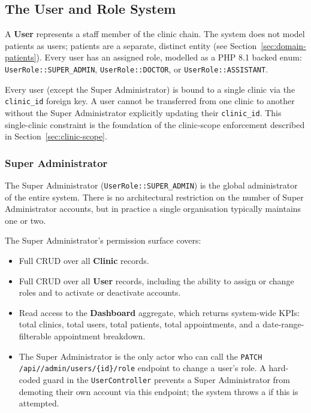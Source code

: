\subsection{The User and Role System}
\label{sec:domain-users}

A \textbf{User} represents a staff member of the clinic chain. The
system does not model patients as users; patients are a separate,
distinct entity (see Section~\ref{sec:domain-patients}). Every user has
an assigned role, modelled as a PHP 8.1 backed enum:
\texttt{UserRole::SUPER\_ADMIN}, \texttt{UserRole::DOCTOR}, or
\texttt{UserRole::ASSISTANT}.

Every user (except the Super Administrator) is bound to a single clinic
via the \texttt{clinic\_id} foreign key. A user cannot be transferred
from one clinic to another without the Super Administrator explicitly
updating their \texttt{clinic\_id}. This single-clinic constraint is
the foundation of the clinic-scope enforcement described in
Section~\ref{sec:clinic-scope}.

\subsubsection{Super Administrator}

The Super Administrator (\texttt{UserRole::SUPER\_ADMIN}) is the global
administrator of the entire system. There is no architectural restriction
on the number of Super Administrator accounts, but in practice a single
organisation typically maintains one or two.

The Super Administrator's permission surface covers:

\begin{itemize}
  \item Full CRUD over all \textbf{Clinic} records.
  \item Full CRUD over all \textbf{User} records, including the ability
    to assign or change roles and to activate or deactivate accounts.
  \item Read access to the \textbf{Dashboard} aggregate, which returns
    system-wide KPIs: total clinics, total users, total patients, total
    appointments, and a date-range-filterable appointment breakdown.
  \item The Super Administrator is the only actor who can call the
    \texttt{PATCH /api/\apiversion{}/admin/users/\{id\}/role} endpoint
    to change a user's role. A hard-coded guard in the
    \texttt{UserController} prevents a Super Administrator from
    demoting their own account via this endpoint; the system throws a
     if this is attempted.
\end{itemize}

